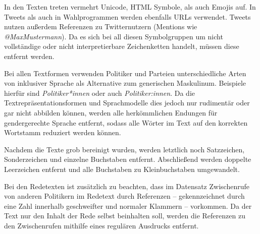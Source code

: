 In den Texten treten vermehrt Unicode, \ac{HTML} Symbole, als auch Emojis auf. In Tweets als auch in Wahlprogrammen werden ebenfalls \acp{URL} verwendet. Tweets nutzen außerdem Referenzen zu Twitternutzern (Mentions wie \textit{@MaxMustermann}). Da es sich bei all diesen Symbolgruppen um nicht vollständige oder nicht interpretierbare Zeichenketten handelt, müssen diese entfernt werden.

Bei allen Textformen verwenden Politiker und Parteien unterschiedliche Arten von inklusiver Sprache als Alternative zum generischen Maskulinum. Beispiele hierfür sind \textit{Politiker*innen} oder auch \textit{Politiker:innen}. Da die Textrepräsentationsformen und Sprachmodelle dies jedoch nur rudimentär oder gar nicht abbilden können, werden alle herkömmlichen Endungen für gendergerechte Sprache entfernt, sodass alle Wörter im Text auf den korrekten Wortstamm reduziert werden können.

Nachdem die Texte grob bereinigt wurden, werden letztlich noch Satzzeichen, Sonderzeichen und einzelne Buchstaben entfernt. Abschließend werden doppelte Leerzeichen entfernt und alle Buchstaben zu Kleinbuchstaben umgewandelt.

Bei den Redetexten ist zusätzlich zu beachten, dass im Datensatz Zwischenrufe von anderen Politikern im Redetext durch Referenzen -- gekennzeichnet durch eine Zahl innerhalb geschweifter und normaler Klammern -- vorkommen. Da der Text nur den Inhalt der Rede selbst beinhalten soll, werden die Referenzen zu den Zwischenrufen mithilfe eines regulären Ausdrucks entfernt.



